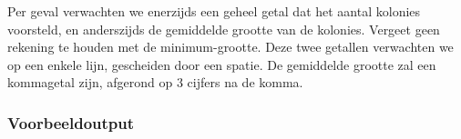 \documentclass[a4paper]{article}
\begin{document}
Per geval verwachten we enerzijds een geheel getal dat het aantal kolonies
voorsteld, en anderszijds de gemiddelde grootte van de kolonies. Vergeet geen
rekening te houden met de minimum-grootte. Deze twee getallen verwachten we op
een enkele lijn, gescheiden door een spatie. De gemiddelde grootte zal een
kommagetal zijn, afgerond op 3 cijfers na de komma.

\subsubsection*{Voorbeeldoutput}


\end{document}
